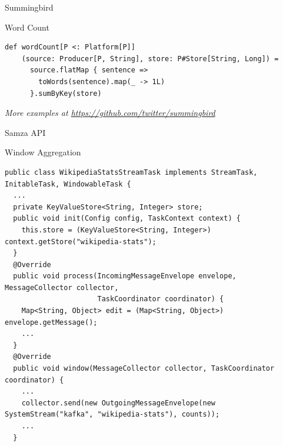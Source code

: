 \documentclass[newPxFont]{beamer}
\begin{document}

\begin{frame}[fragile]{Summingbird}
\begin{exampleblock}{Word Count}
\begin{verbatim}
def wordCount[P <: Platform[P]]
    (source: Producer[P, String], store: P#Store[String, Long]) =
      source.flatMap { sentence =>
        toWords(sentence).map(_ -> 1L)
      }.sumByKey(store)
\end{verbatim}
\end{exampleblock}
\vspace{-1.5em}
\begin{flushright}
\tiny\textit{More examples at \url{https://github.com/twitter/summingbird}}
\end{flushright}
\end{frame}


\begin{frame}[fragile]{Samza API}
\begin{exampleblock}{Window Aggregation}
\begin{verbatim}
public class WikipediaStatsStreamTask implements StreamTask, InitableTask, WindowableTask {
  ...
  private KeyValueStore<String, Integer> store;
  public void init(Config config, TaskContext context) {
    this.store = (KeyValueStore<String, Integer>) context.getStore("wikipedia-stats");
  }
  @Override
  public void process(IncomingMessageEnvelope envelope, MessageCollector collector, 
                      TaskCoordinator coordinator) {
    Map<String, Object> edit = (Map<String, Object>) envelope.getMessage();
    ...
  }
  @Override
  public void window(MessageCollector collector, TaskCoordinator coordinator) {
    ...
    collector.send(new OutgoingMessageEnvelope(new SystemStream("kafka", "wikipedia-stats"), counts));
    ...
  }
\end{verbatim}
\end{exampleblock}

\end{frame}


\end{document}

